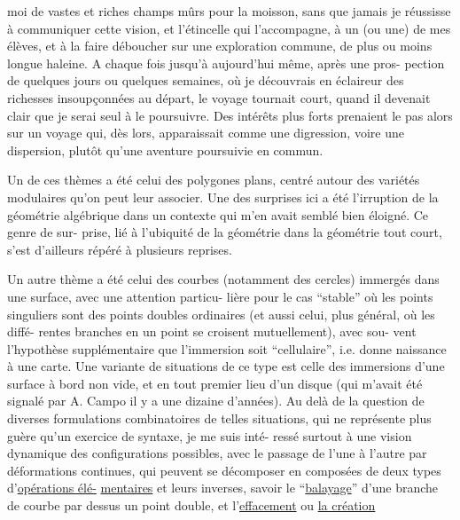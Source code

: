 
moi de vastes et riches champs mûrs pour la moisson, sans que
jamais je réussisse à communiquer cette vision, et l'étincelle
qui l'accompagne, à un (ou une) de mes élèves, et à la faire
déboucher sur une exploration commune, de plus ou moins longue
haleine. A chaque fois jusqu'à aujourd'hui même, après une pros-%
pection de quelques jours ou quelques semaines, où je découvrais
en éclaireur des richesses insoupçonnées au départ, le voyage
tournait court, quand il devenait clair que je serai seul à le
poursuivre. Des intérêts plus forts prenaient le pas alors sur
un voyage qui, dès lors, apparaissait comme une digression, voire
une dispersion, plutôt qu'une aventure poursuivie en commun.

Un de ces thèmes a été celui des polygones plans, centré
autour des variétés modulaires qu'on peut leur associer. Une des
surprises ici a été l'irruption de la géométrie algébrique dans
un contexte qui m'en avait semblé bien éloigné. Ce genre de sur-%
prise, lié à l'ubiquité de la géométrie dans la géométrie tout
court, s'est d'ailleurs répéré à plusieurs reprises.

Un autre thème a été celui des courbes (notamment des
cercles) immergés dans une surface, avec une attention particu-%
lière pour le cas ``stable'' où les points singuliers sont des points
doubles ordinaires (et aussi celui, plus général, où les diffé-%
rentes branches en un point se croisent mutuellement), avec sou-%
vent l'hypothèse supplémentaire que l'immersion soit ``cellulaire'',
i.e. donne naissance à une carte. Une variante de situations de
ce type est celle des immersions d'une surface à bord non vide,
et en tout premier lieu d'un disque (qui m'avait été signalé par
A. Campo il y a une dizaine d'années). Au delà de la question de
diverses formulations combinatoires de telles situations, qui ne
représente plus guère qu'un exercice de syntaxe, je me suis inté-%
ressé surtout à une vision dynamique des configurations possibles,
avec le passage de l'une à l'autre par déformations continues, qui
peuvent se décomposer en composées de deux types d'\uline{opérations élé-}%
\uline{mentaires} et leurs inverses, savoir le ``\uline{balayage}'' d'une branche
de courbe par dessus un point double, et l'\uline{effacement} ou \uline{la création}

